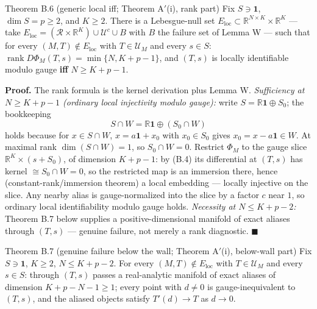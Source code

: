 \begin{namedthm}{Theorem B.6 (generic local iff; Theorem A$'$(i), rank part)}
Fix $S\ni\mathbf 1$, $\dim S=p\ge2$, and $K\ge2$. There is a Lebesgue-null set $E_{\mathrm{loc}}\subset\mathbb R^{N\times K}\times\mathbb R^K$ --- take $E_{\mathrm{loc}}=(\mathcal R\times\mathbb R^K)\cup\mathcal U^c\cup B$ with $B$ the failure set of Lemma W --- such that for every $(M,T)\notin E_{\mathrm{loc}}$ with $T\in\mathcal U_M$ and every $s\in S$: $\operatorname{rank}D\Phi_M(T,s)=\min\{N,K+p-1\}$, and $(T,s)$ is locally identifiable modulo gauge \textbf{iff} $N\ge K+p-1$.
\end{namedthm}

\noindent\textbf{Proof.} The rank formula is the kernel derivation plus Lemma W. \emph{Sufficiency at $N\ge K+p-1$ (ordinary local injectivity modulo gauge):} write $S=\mathbb R\mathbf 1\oplus S_0$; the bookkeeping
\[
S\cap W=\mathbb R\mathbf 1\oplus(S_0\cap W)
\]
holds because for $x\in S\cap W$, $x=a\mathbf 1+x_0$ with $x_0\in S_0$ gives $x_0=x-a\mathbf 1\in W$. At maximal rank $\dim(S\cap W)=1$, so $S_0\cap W=0$. Restrict $\Phi_M$ to the gauge slice $\mathbb R^K\times(s+S_0)$, of dimension $K+p-1$: by (B.4) its differential at $(T,s)$ has kernel $\cong S_0\cap W=0$, so the restricted map is an immersion there, hence (constant-rank/immersion theorem) a local embedding --- locally injective on the slice. Any nearby alias is gauge-normalized into the slice by a factor $c$ near $1$, so ordinary local identifiability modulo gauge holds. \emph{Necessity at $N\le K+p-2$:} Theorem B.7 below supplies a positive-dimensional manifold of exact aliases through $(T,s)$ --- genuine failure, not merely a rank diagnostic. \hfill$\blacksquare$

\begin{namedthm}{Theorem B.7 (genuine failure below the wall; Theorem A$'$(i), below-wall part)}
Fix $S\ni\mathbf 1$, $K\ge2$, $N\le K+p-2$. For every $(M,T)\notin E_{\mathrm{loc}}$ with $T\in\mathcal U_M$ and every $s\in S$: through $(T,s)$ passes a real-analytic manifold of exact aliases of dimension $K+p-N-1\ge1$; every point with $d\neq0$ is gauge-inequivalent to $(T,s)$, and the aliased objects satisfy $T'(d)\to T$ as $d\to0$.
\end{namedthm}

